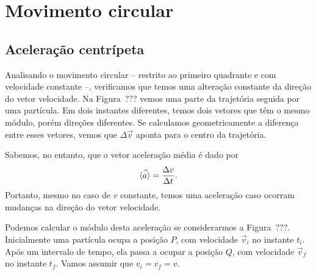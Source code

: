 \section{Movimento circular}
\subsection{Aceleração centrípeta}

Analisando o movimento circular -- restrito ao primeiro quadrante e com velocidade constante --, verificamos que temos uma alteração constante da direção do vetor velocidade. Na Figura~??? vemos uma parte da trajetória seguida por uma partícula. Em dois instantes diferentes, temos dois vetores que têm o mesmo módulo, porém direções diferentes. Se calculamos geometricamente a diferença entre esses vetores, vemos que $\Delta \vec{v}$ aponta para o centro da trajetória.

Sabemos, no entanto, que o vetor aceleração média é dado por
\begin{equation}
  \vec{\left\langle{a}\right\rangle} = \frac{\Delta v}{\Delta t}.
\end{equation}
%
Portanto, mesmo no caso de $v$ constante, temos uma aceleração caso ocorram mudanças na direção do vetor velocidade. 

Podemos calcular o módulo desta aceleração se considerarmos a Figura~???. 
Inicialmente uma partícula ocupa a posição $P$, com velocidade $\vec{v}_i$ no instante $t_i$. Após um intervalo de tempo, ela passa a ocupar a posição $Q$, com velocidade $\vec{v}_f$ no instante $t_f$. Vamos assumir que $v_i = v_f = v$. 

